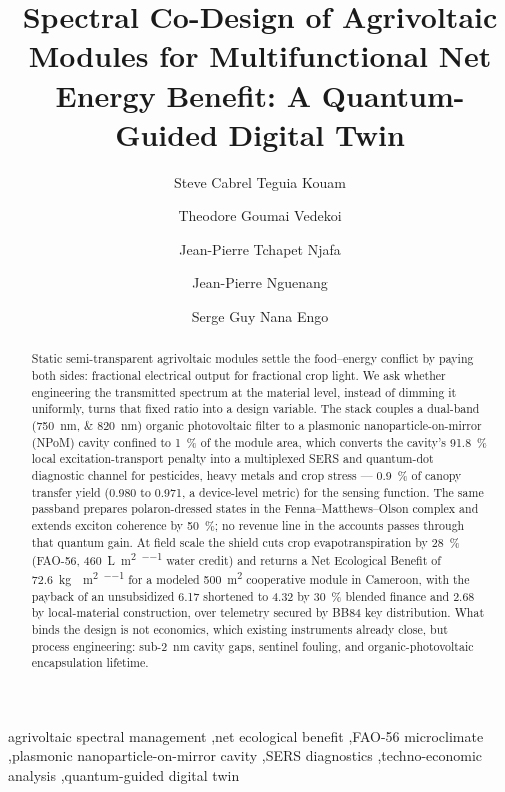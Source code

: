 \documentclass[preprint,12pt]{elsarticle}
\begin{document}
\linenumbers

\begin{frontmatter}

\title{Spectral Co-Design of Agrivoltaic Modules for Multifunctional Net Energy Benefit: A Quantum-Guided Digital Twin}

\author[udla]{Steve Cabrel Teguia Kouam}
\author[uy1]{Theodore Goumai Vedekoi}
\author[uy1]{Jean-Pierre Tchapet Njafa}
\author[udla]{Jean-Pierre Nguenang}
\author[uy1]{Serge Guy Nana Engo}


\address[udla]{Department of Physics, Faculty of Science, University of Douala, Cameroon}
\address[uy1]{Department of Physics, Faculty of Science, University of Yaound\'{e} I, Cameroon}

\begin{abstract}
Static semi-transparent agrivoltaic modules settle the food--energy conflict by paying both sides: fractional electrical output for fractional crop light. We ask whether engineering the transmitted spectrum at the material level, instead of dimming it uniformly, turns that fixed ratio into a design variable. The stack couples a dual-band (\qtylist{750;820}{\nm}) organic photovoltaic filter to a plasmonic nanoparticle-on-mirror (NPoM) cavity confined to \qty{1}{\percent} of the module area, which converts the cavity's \qty{91.8}{\percent} local excitation-transport penalty into a multiplexed SERS and quantum-dot diagnostic channel for pesticides, heavy metals and crop stress --- \qty{0.9}{\percent} of canopy transfer yield (\num{0.980} to \num{0.971}, a device-level metric) for the sensing function. The same passband prepares polaron-dressed states in the Fenna--Matthews--Olson complex and extends exciton coherence by \qty{50}{\percent}; no revenue line in the accounts passes through that quantum gain. At field scale the shield cuts crop evapotranspiration by \qty{28}{\percent} (FAO-56, \qty{460}{\L\per\m\squared\per\yr} water credit) and returns a Net Ecological Benefit of \qty{72.6}{\kg{}\per\m\squared\per\yr} for a modeled \qty{500}{\m\squared} cooperative module in Cameroon, with the payback of an unsubsidized \qty{6.17}{\yr} shortened to \qty{4.32}{\yr} by \qty{30}{\percent} blended finance and \qty{2.68}{\yr} by local-material construction, over telemetry secured by BB84 key distribution. What binds the design is not economics, which existing instruments already close, but process engineering: sub-\qty{2}{\nano\meter} cavity gaps, sentinel fouling, and organic-photovoltaic encapsulation lifetime.
\end{abstract}

\begin{keyword}
agrivoltaic spectral management \sep net ecological benefit \sep FAO-56 microclimate \sep plasmonic nanoparticle-on-mirror cavity \sep SERS diagnostics \sep techno-economic analysis \sep quantum-guided digital twin
\end{keyword}

\end{frontmatter}
\end{document}
